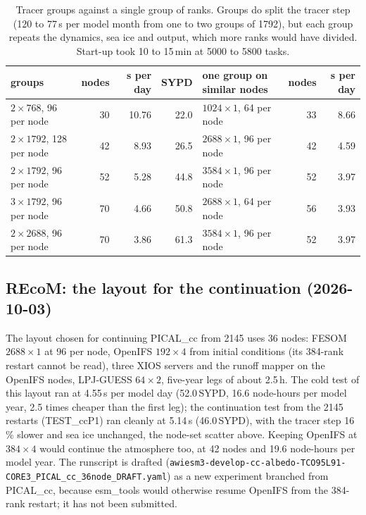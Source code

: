 \documentclass[11pt,a4paper]{article}
\begin{document}
\begin{table}[H]\centering\footnotesize
\begin{tabular}{lrrr@{\hspace{2em}}lrr}\toprule
groups & nodes & s per day & SYPD & one group on similar nodes & nodes & s per day\\\midrule
$2\times768$, 96 per node & 30 & 10.76 & 22.0 & $1024\times1$, 64 per node & 33 & 8.66\\
$2\times1792$, 128 per node & 42 & 8.93 & 26.5 & $2688\times1$, 96 per node & 42 & 4.59\\
$2\times1792$, 96 per node & 52 & 5.28 & 44.8 & $3584\times1$, 96 per node & 52 & 3.97\\
$3\times1792$, 96 per node & 70 & 4.66 & 50.8 & $2688\times1$, 64 per node & 56 & 3.93\\
$2\times2688$, 96 per node & 70 & 3.86 & 61.3 & $3584\times1$, 96 per node & 52 & 3.97\\\bottomrule
\end{tabular}
\caption{Tracer groups against a single group of ranks. Groups do split the tracer step (120 to 77\,s per model month from one to two groups of 1792), but each group repeats the dynamics, sea ice and output, which more ranks would have divided. Start-up took 10 to 15\,min at 5000 to 5800 tasks.}\label{tab:groups}
\end{table}

\subsection{REcoM: the layout for the continuation (2026-10-03)}
The layout chosen for continuing PICAL\_cc from 2145 uses 36 nodes: FESOM $2688\times1$ at 96 per node, OpenIFS $192\times4$ from initial conditions (its 384-rank restart cannot be read), three XIOS servers and the runoff mapper on the OpenIFS nodes, LPJ-GUESS $64\times2$, five-year legs of about 2.5\,h. The cold test of this layout ran at 4.55\,s per model day (52.0\,SYPD, 16.6 node-hours per model year, 2.5 times cheaper than the first leg); the continuation test from the 2145 restarts (TEST\_ccP1) ran cleanly at 5.14\,s (46.0\,SYPD), with the tracer step 16\,\% slower and sea ice unchanged, the node-set scatter above. Keeping OpenIFS at $384\times4$ would continue the atmosphere too, at 42 nodes and 19.6 node-hours per model year. The runscript is drafted (\texttt{awiesm3-develop-cc-albedo-TCO95L91-CORE3\_PICAL\_cc\_36node\_DRAFT.yaml}) as a new experiment branched from PICAL\_cc, because esm\_tools would otherwise resume OpenIFS from the 384-rank restart; it has not been submitted.
\end{document}
